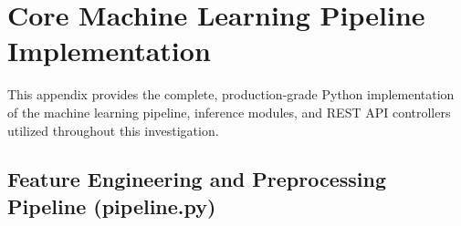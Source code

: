 \documentclass[12pt,a4paper,oneside]{report}
\begin{document}
\appendix

\chapter{Core Machine Learning Pipeline Implementation}
\label{app:code_pipeline}

This appendix provides the complete, production-grade Python implementation of the machine learning pipeline, inference modules, and REST API controllers utilized throughout this investigation.

\section{Feature Engineering and Preprocessing Pipeline (pipeline.py)}
\end{document}
